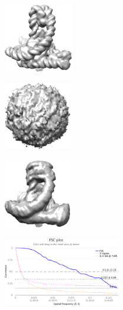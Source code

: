 \begin{figure}[t]
    \begin{subfigure}[b]{0.23\linewidth}
        \centering
        \includegraphics[height=3cm]{figures/5j0n_fullcvg_uniformS2_noise0_gt.png}
        \caption{}\label{fig:5j0n-noise0-reconstruction-true}
    \end{subfigure}
    \hfill
    \begin{subfigure}[b]{0.18\linewidth}
        \centering
        \includegraphics[height=3cm]{figures/5j0n_fullcvg_uniformS2_noise0_rand.png}
        \caption{}
    \end{subfigure}
    \hfill
    \begin{subfigure}[b]{0.23\linewidth}
        \centering
        \includegraphics[height=3cm]{figures/5j0n_fullcvg_uniformS2_noise0_apr.png}
        \caption{}\label{fig:5j0n-noise0-reconstruction-recovered}
    \end{subfigure}
    \hfill
    \begin{subfigure}[b]{0.31\linewidth}
        \centering
        \includegraphics[height=3cm]{figures/5j0n_fullcvg_uniformS2_noise0_FSC_apr_init.pdf}
        \caption{}
    \end{subfigure}


\end{figure}
